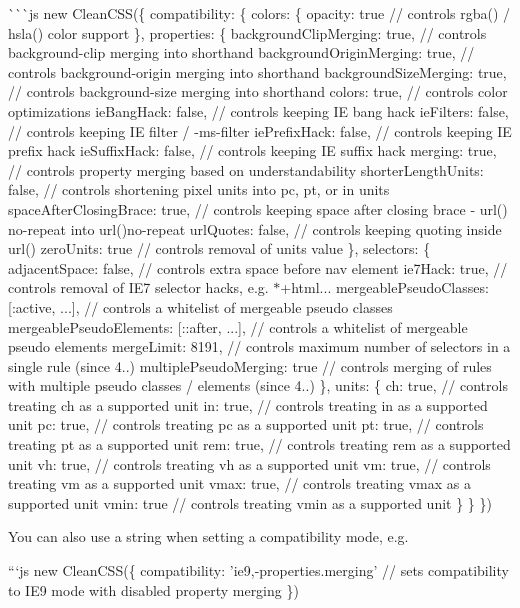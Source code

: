 \`{}\`{}\`{}js new Clean\+C\+SS(\{ compatibility\+: \{ colors\+: \{ opacity\+: true // controls {\ttfamily rgba()} / {\ttfamily hsla()} color support \}, properties\+: \{ background\+Clip\+Merging\+: true, // controls background-\/clip merging into shorthand background\+Origin\+Merging\+: true, // controls background-\/origin merging into shorthand background\+Size\+Merging\+: true, // controls background-\/size merging into shorthand colors\+: true, // controls color optimizations ie\+Bang\+Hack\+: false, // controls keeping IE bang hack ie\+Filters\+: false, // controls keeping IE {\ttfamily filter} / {\ttfamily -\/ms-\/filter} ie\+Prefix\+Hack\+: false, // controls keeping IE prefix hack ie\+Suffix\+Hack\+: false, // controls keeping IE suffix hack merging\+: true, // controls property merging based on understandability shorter\+Length\+Units\+: false, // controls shortening pixel units into {\ttfamily pc}, {\ttfamily pt}, or {\ttfamily in} units space\+After\+Closing\+Brace\+: true, // controls keeping space after closing brace -\/ {\ttfamily url() no-\/repeat} into {\ttfamily url()no-\/repeat} url\+Quotes\+: false, // controls keeping quoting inside {\ttfamily url()} zero\+Units\+: true // controls removal of units {} value \}, selectors\+: \{ adjacent\+Space\+: false, // controls extra space before {\ttfamily nav} element ie7\+Hack\+: true, // controls removal of I\+E7 selector hacks, e.\+g. {\ttfamily $\ast$+html...} mergeable\+Pseudo\+Classes\+: \mbox{[}\textquotesingle{}\+:active\textquotesingle{}, ...\mbox{]}, // controls a whitelist of mergeable pseudo classes mergeable\+Pseudo\+Elements\+: \mbox{[}\textquotesingle{}\+::after\textquotesingle{}, ...\mbox{]}, // controls a whitelist of mergeable pseudo elements merge\+Limit\+: 8191, // controls maximum number of selectors in a single rule (since 4..) multiple\+Pseudo\+Merging\+: true // controls merging of rules with multiple pseudo classes / elements (since 4..) \}, units\+: \{ ch\+: true, // controls treating {\ttfamily ch} as a supported unit in\+: true, // controls treating {\ttfamily in} as a supported unit pc\+: true, // controls treating {\ttfamily pc} as a supported unit pt\+: true, // controls treating {\ttfamily pt} as a supported unit rem\+: true, // controls treating {\ttfamily rem} as a supported unit vh\+: true, // controls treating {\ttfamily vh} as a supported unit vm\+: true, // controls treating {\ttfamily vm} as a supported unit vmax\+: true, // controls treating {\ttfamily vmax} as a supported unit vmin\+: true // controls treating {\ttfamily vmin} as a supported unit \} \} \}) 
\begin{DoxyCode}
You can also use a string when setting a compatibility mode, e.g.

```js
new CleanCSS(\{
  compatibility: 'ie9,-properties.merging' // sets compatibility to IE9 mode with disabled property merging
\})
\end{DoxyCode}


